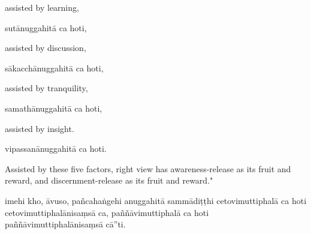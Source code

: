 \begin{samepage}
\begin{leftcolumn*}
assisted by learning,
\end{leftcolumn*}

\begin{rightcolumn}
sutānuggahitā ca hoti,
\end{rightcolumn}
\end{samepage}

\begin{samepage}
\begin{leftcolumn*}
assisted by discussion,
\end{leftcolumn*}

\begin{rightcolumn}
sākacchānuggahitā ca hoti,
\end{rightcolumn}
\end{samepage}

\begin{samepage}
\begin{leftcolumn*}
assisted by tranquility,
\end{leftcolumn*}

\begin{rightcolumn}
samathānuggahitā ca hoti,
\end{rightcolumn}
\end{samepage}

\begin{samepage}
\begin{leftcolumn*}
assisted by insight.
\end{leftcolumn*}

\begin{rightcolumn}
vipassanānuggahitā ca hoti.
\end{rightcolumn}
\end{samepage}

\begin{samepage}
\begin{leftcolumn*}
Assisted by these five factors, right view has awareness-release as its fruit and reward, and discernment-release as its fruit and reward."
\end{leftcolumn*}

\begin{rightcolumn}
imehi kho, āvuso, pañcahaṅgehi anuggahitā sammādiṭṭhi cetovimuttiphalā ca hoti cetovimuttiphalānisaṃsā ca, paññāvimuttiphalā ca hoti paññāvimuttiphalānisaṃsā cā”ti.
\end{rightcolumn}
\end{samepage}

